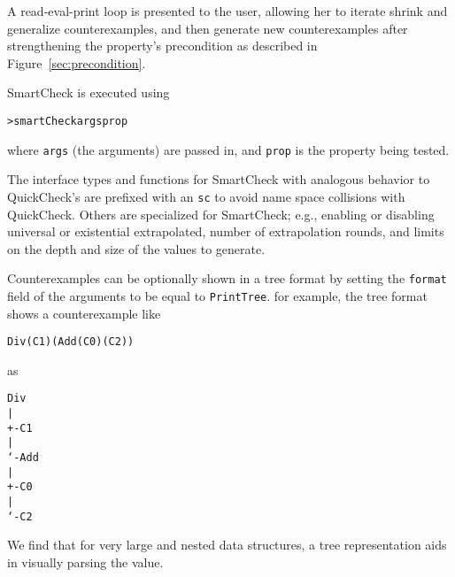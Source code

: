 \documentclass{sigplanconf}
\newenvironment{code}{\begin{alltt}\footnotesize}{\end{alltt}}
\newcommand{\ttp}[1]{\texttt{#1}}
\begin{document}

A read-eval-print loop is presented to the user, allowing her to iterate shrink
and generalize counterexamples, and then generate new counterexamples after
strengthening the property's precondition as described in
Figure~\ref{sec:precondition}.

SmartCheck is executed using
%
\begin{code}
> smartCheck args prop
\end{code}
%
\noindent
where \ttp{args} (the arguments) are passed in, and \ttp{prop} is the property
being tested.

The interface types and functions for SmartCheck with analogous behavior to
QuickCheck's are prefixed with an \ttp{sc} to avoid name space collisions with
QuickCheck.  Others are specialized for SmartCheck; e.g., enabling or disabling
universal or existential extrapolated, number of extrapolation rounds, and
limits on the depth and size of the values to generate.

Counterexamples can be optionally shown in a tree format by setting the
\ttp{format} field of the arguments to be equal to \ttp{PrintTree}.  for
example, the tree format shows a counterexample like
%
\begin{code}
Div (C 1) (Add (C 0) (C 2))
\end{code}
%
\noindent
as
%
\begin{samepage}
\begin{code}
Div
|
+- C 1
|
`- Add
   |
   +- C 0
   |
   `- C 2
\end{code}
\end{samepage}
%
\noindent
We find that for very large and nested data structures, a tree representation
aids in visually parsing the value.
\end{document}
